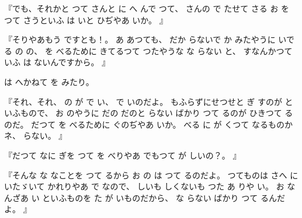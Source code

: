 
『でも、それかと
つて
さんと
に
へ
んで
つて、
さんの
で
たせて
さる
お
を
つて
さうといふ
は
いと
ひぢやあ
いか。
』

『そりやあもう
ですとも！。
あ
あつても、
だか
らないで
か
みたやうに
いでる
の
の、
を
べるために
きてるつて
つたやうな
な
らない
と、
すなんかつていふ
は
ないんですから。
』

は
へかねて
を
みたり。

『それ、それ、
の
が
で
い、
で
いのだよ。
もふらずにせつせと
ぎ
すのが
といふもので、
お
のやうに
だの
だのと
らない
ばかり
つて
るのが
ひきつて
るのだ。
だつて
を
べるために
ぐのぢやあ
いか。
べる
に
が
くつて
なるものかネ、
らない。
』

『だつて
なに
ぎを
      つて
を
べりやあ
でもつて
が
しいの？。
』

『そんな
な
なことを
つて
るから
お
の
は
つて
るのだよ。
つてものは
さへ
にいたゞいて
かれりやあ
で
なので、
しいも
しくないも
つた
あ
りや
い。
お
なんざあ
い
といふものを
た
が
いものだから、
な
らない
ばかり
つて
るんだよ。
』

